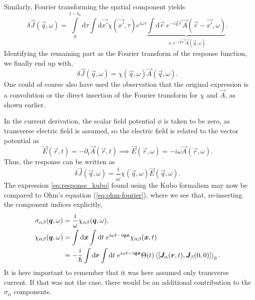 Similarly, Fourier transforming the spatial component yields
\begin{equation}
  \label{eq:resonse_fourier}
  \delta \vec{J}(\vec{q}, \omega) =
  \int\limits_0^{t - t_0}\mathrm{d}\tau
  \int \mathrm{d} \vec{x'}
  \chi(\vec{x'}, \tau)
  e^{i \omega\tau}
  \underbrace{
    \int \mathrm{d}\vec{r} \;
    e^{-i \vec{q} \vec{r}}
  \vec{A}(\vec{r} - \vec{x'}, \omega)
  }_{\equiv e^{-i \vec{q} \vec{x'}} \vec{A}(\vec{q}, \omega)}.
\end{equation}
Identifying the remaining part as the Fourier transform of the response function, we finally end up with,
\begin{equation}
  \delta \vec{J}(\vec{q}, \omega) =
  \chi(\vec{q}, \omega)
  \vec{A}(\vec{q}, \omega).
\end{equation}
One could of course also have used the observation that the original expression is a convolution or the direct insertion of the Fourier transform for $\chi $ and $\vec{A}$, as shown earlier.

In the current derivation, the scalar field potential $\phi$ is taken to be zero, as transverse electric field is assumed, so the electric field is related to the vector potential as
\begin{equation}
  \label{eq:em_field_electric}
  \vec{E}(\vec{r}, t) = -\partial_t \vec{A}(\vec{r}, t) \implies \vec{E}(\vec{r}, \omega) = -i \omega \vec{A}(\vec{r}, \omega).
\end{equation}
Thus, the response can be written as
\begin{equation}
  \label{eq:response_kubo}
  \delta \vec{J}(\vec{q}, \omega) =
  \frac{i}{\omega}
  \chi(\vec{q}, \omega)
  \vec{E}(\vec{q}, \omega).
\end{equation}
The expression \eqref{eq:response_kubo} found using the Kubo formalism may now be compared to Ohm's equation (\ref{eq:ohm-fourier}), where we see that, re-inserting the component indices explicitly,
\begin{align}
    \sigma_{\alpha\beta}(\vec{q}, \omega) &= \frac{i}{\omega} \chi_{\alpha\beta}(\vec{q}, \omega), \\
  \chi_{\alpha\beta}(\vec{q}, \omega) &= \int \mathrm{d}\vec{x} \int \mathrm{d} t \; e^{i\omega t -i \vec{q} \vec{x}}\chi_{\alpha\beta}(\vec{x}, t)\\
  &=
    -\frac{i}{\hbar}\int \mathrm{d} \vec{r} \int \mathrm{d} t \; e^{i \omega t - i \vec{q} \vec{x}}
    \Theta (t)
    \Braket{\left[
       \vec{J}_{\alpha}(\vec{r}, t), \vec{J}_{\beta}(0, 0)
      \right]}_0. \nonumber
\end{align}
It is here important to remember that it was here assumed only transverse current.
If that was not the case, there would be an additional contribution to the $\sigma_{ii}$ components.

